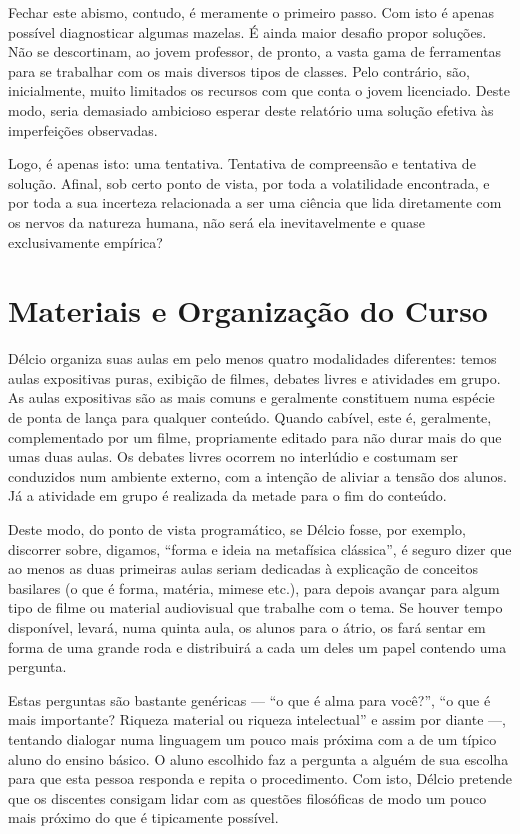 \documentclass[12pt,a4paper]{article}
\begin{document}
	Fechar este abismo, contudo, é meramente o primeiro passo. Com isto é 
	apenas possível diagnosticar algumas mazelas. É ainda maior desafio 
	propor soluções. Não se descortinam, ao jovem professor, de pronto, 
	a vasta gama de ferramentas para se trabalhar com os mais diversos 
	tipos de classes. Pelo contrário, são, inicialmente, muito limitados 
	os recursos com que conta o jovem licenciado. Deste modo, seria 
	demasiado ambicioso esperar deste relatório uma solução efetiva 
	às imperfeições observadas. 
	
	Logo, é apenas isto: uma tentativa. Tentativa de compreensão e 
	tentativa de solução. Afinal, sob certo ponto de vista, por toda a 
	volatilidade encontrada, e por toda a sua incerteza relacionada a 
	ser uma ciência que lida diretamente com os nervos da natureza 
	humana, não será ela inevitavelmente e quase exclusivamente empírica? 
	
	
	\newpage
	
	\section{Materiais e Organização do Curso}
	
    Délcio organiza suas aulas em pelo menos quatro modalidades diferentes: 
    temos aulas expositivas puras, exibição de filmes, debates livres e 
    atividades em grupo. As aulas expositivas são as mais comuns e geralmente 
    constituem numa espécie de ponta de lança para qualquer conteúdo. Quando 
    cabível, este é, geralmente, complementado por um filme, propriamente 
    editado para não durar mais do que umas duas aulas. Os debates livres 
    ocorrem no interlúdio e costumam ser conduzidos num ambiente externo, com 
    a intenção de aliviar a tensão dos alunos. Já a atividade em grupo é 
    realizada da metade para o fim do conteúdo. 
    
    Deste modo, do ponto de vista programático, se Délcio fosse, por exemplo, 
    discorrer sobre, digamos, ``forma e ideia na metafísica clássica'', 
    é seguro dizer que ao menos as duas primeiras aulas seriam dedicadas à 
    explicação de conceitos basilares (o que é forma, matéria, mimese etc.), 
    para depois avançar para algum tipo de filme ou material audiovisual 
    que trabalhe com o tema. Se houver tempo disponível, levará, numa quinta 
    aula, os alunos para o átrio, os fará sentar em forma de uma grande roda 
    e distribuirá a cada um deles um papel contendo uma pergunta. 
    
    Estas perguntas são bastante genéricas --- ``o que é alma para você?'', 
    ``o que é mais importante? Riqueza material ou riqueza intelectual'' e 
    assim por diante ---, tentando dialogar numa linguagem um pouco mais 
    próxima com a de um típico aluno do ensino básico. O aluno escolhido faz 
    a pergunta a alguém de sua escolha para que esta pessoa responda e repita 
    o procedimento. Com isto, Délcio pretende que os discentes consigam lidar 
    com as questões filosóficas de modo um pouco mais próximo do que 
    é tipicamente possível. 
    
\end{document}
